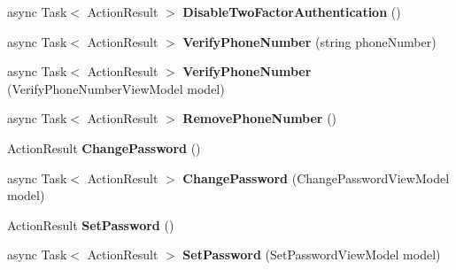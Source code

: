 \begin{DoxyCompactItemize}
async Task$<$ Action\+Result $>$ {\bfseries Disable\+Two\+Factor\+Authentication} ()
\item 
\mbox{\label{class_alfa_accounting_1_1_controllers_1_1_manage_controller_a408f216c8fcfae7db1ab1704b36831ac}} 
async Task$<$ Action\+Result $>$ {\bfseries Verify\+Phone\+Number} (string phone\+Number)
\item 
\mbox{\label{class_alfa_accounting_1_1_controllers_1_1_manage_controller_af0637ce5c6a4b9fb33d26c816fd32976}} 
async Task$<$ Action\+Result $>$ {\bfseries Verify\+Phone\+Number} (Verify\+Phone\+Number\+View\+Model model)
\item 
\mbox{\label{class_alfa_accounting_1_1_controllers_1_1_manage_controller_acede33f04dd1a1a411e1c1ae9ed73f5e}} 
async Task$<$ Action\+Result $>$ {\bfseries Remove\+Phone\+Number} ()
\item 
\mbox{\label{class_alfa_accounting_1_1_controllers_1_1_manage_controller_a54c528dcbde61ef29232d4d12489775c}} 
Action\+Result {\bfseries Change\+Password} ()
\item 
\mbox{\label{class_alfa_accounting_1_1_controllers_1_1_manage_controller_a2190f6ae6a50a480d586f74a3f5ca309}} 
async Task$<$ Action\+Result $>$ {\bfseries Change\+Password} (Change\+Password\+View\+Model model)
\item 
\mbox{\label{class_alfa_accounting_1_1_controllers_1_1_manage_controller_a569e4942f8e877882596b085b773b713}} 
Action\+Result {\bfseries Set\+Password} ()
\item 
\mbox{\label{class_alfa_accounting_1_1_controllers_1_1_manage_controller_a77f0d3fd5974668abcc9b3183cf89bc4}} 
async Task$<$ Action\+Result $>$ {\bfseries Set\+Password} (Set\+Password\+View\+Model model)
\item 
\mbox{\label{class_alfa_accounting_1_1_controllers_1_1_manage_controller_a6ec0abed8a0d990830f602369f808bb5}} 

\end{DoxyCompactItemize}
